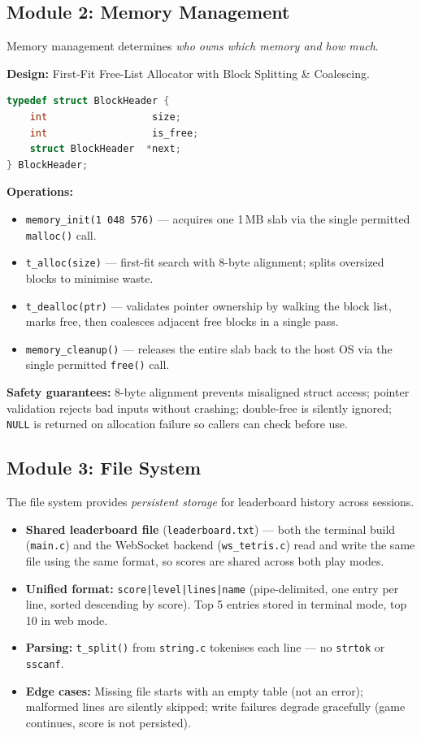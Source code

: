 \documentclass[conference]{IEEEtran}
\begin{document}
\subsection{Module 2: Memory Management}
Memory management determines \textit{who owns which memory and how much}.

\textbf{Design:} First-Fit Free-List Allocator with Block Splitting \& Coalescing.

\begin{lstlisting}[language=C,caption={BlockHeader Structure}]
typedef struct BlockHeader {
    int                  size;
    int                  is_free;
    struct BlockHeader  *next;
} BlockHeader;
\end{lstlisting}

\textbf{Operations:}
\begin{itemize}
  \item \texttt{memory\_init(1\,048\,576)} --- acquires one 1\,MB slab via the single permitted \texttt{malloc()} call.
  \item \texttt{t\_alloc(size)} --- first-fit search with 8-byte alignment; splits oversized blocks to minimise waste.
  \item \texttt{t\_dealloc(ptr)} --- validates pointer ownership by walking the block list, marks free, then coalesces adjacent free blocks in a single pass.
  \item \texttt{memory\_cleanup()} --- releases the entire slab back to the host OS via the single permitted \texttt{free()} call.
\end{itemize}

\textbf{Safety guarantees:} 8-byte alignment prevents misaligned struct access; pointer validation rejects bad inputs without crashing; double-free is silently ignored; \texttt{NULL} is returned on allocation failure so callers can check before use.

\subsection{Module 3: File System}
The file system provides \textit{persistent storage} for leaderboard history across sessions.

\begin{itemize}
  \item \textbf{Shared leaderboard file} (\texttt{leaderboard.txt}) --- both the terminal build (\texttt{main.c}) and the WebSocket backend (\texttt{ws\_tetris.c}) read and write the same file using the same format, so scores are shared across both play modes.
  \item \textbf{Unified format:} \texttt{score|level|lines|name} (pipe-delimited, one entry per line, sorted descending by score). Top 5 entries stored in terminal mode, top 10 in web mode.
  \item \textbf{Parsing:} \texttt{t\_split()} from \texttt{string.c} tokenises each line --- no \texttt{strtok} or \texttt{sscanf}.
  \item \textbf{Edge cases:} Missing file starts with an empty table (not an error); malformed lines are silently skipped; write failures degrade gracefully (game continues, score is not persisted).
\end{itemize}
\end{document}
